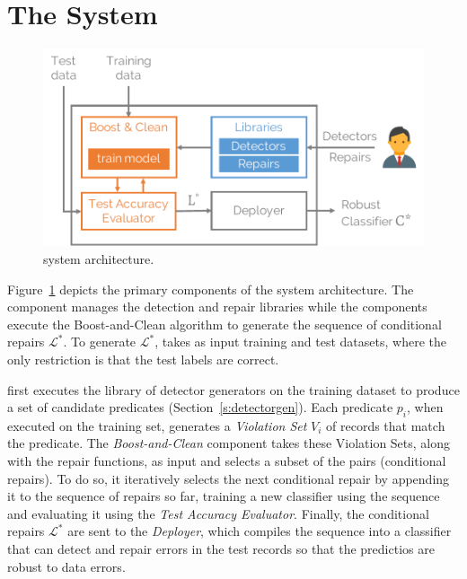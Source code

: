 \section{The \sys System}\label{s:arch}
 
\begin{figure}[h]
\centering
\includegraphics[width=0.8\columnwidth]{figures/arch.pdf}
\caption{\sys system architecture.}
\label{f:arch}
\end{figure}

Figure~\ref{f:arch} depicts the primary components of the system architecture. The  component manages the detection and repair libraries while the  components execute the Boost-and-Clean algorithm to generate the sequence of conditional repairs $\mathcal{L}^*$.  To generate $\mathcal{L}^*$, \sys takes as input training and test datasets, where the only restriction is that the test labels are correct. 

\sys first executes the library of detector generators on the training dataset to produce a set of candidate predicates (Section~\ref{s:detectorgen}).  Each predicate $p_i$, when executed on the training set, generates a {\it Violation Set} $V_i$ of records that match the predicate.  The {\it Boost-and-Clean} component takes these Violation Sets, along with the repair functions, as input and selects a subset of the pairs (conditional repairs).  To do so, it iteratively selects the next conditional repair by appending it to the sequence of repairs so far, training a new classifier using the sequence and evaluating it using the {\it Test Accuracy Evaluator}.  Finally, the conditional repairs $\mathcal{L}^*$ are sent to the {\it Deployer}, which compiles the sequence into a  classifier that can detect and repair errors in the test records so that the predictios are robust to data errors.  

